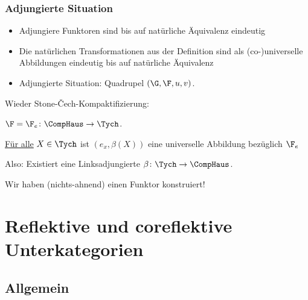 \documentclass[serif,9pt]{beamer}
\begin{document}
\begin{frame}
  \frametitle{Adjungierte Situation}

  \begin{itemize}
    \item Adjungiere Funktoren sind bis auf natürliche Äquivalenz eindeutig
    \item Die natürlichen Transformationen aus der Definition sind als (co-)universelle Abbildungen eindeutig bis auf natürliche Äquivalenz
    \item Adjungierte Situation: Quadrupel $(\G, \F, u, v)$. 
  \end{itemize}

  \begin{ex*}
     Wieder Stone-\v{C}ech-Kompaktifizierung:

     $\F = \F_e \colon \CompHaus \to \Tych$.

     \underline{Für alle} $X \in \Tych$ ist $(e_x, \beta(X))$ eine universelle Abbildung bezüglich $\F_e$
     
     Also: Existiert eine Linksadjungierte $\beta \colon \Tych \to \CompHaus$.
     \vspace{1em}

     Wir haben (nichts-ahnend) einen Funktor konstruiert!
  \end{ex*}

\end{frame}


\section{Reflektive und coreflektive Unterkategorien}

\subsection{Allgemein}
\end{document}
